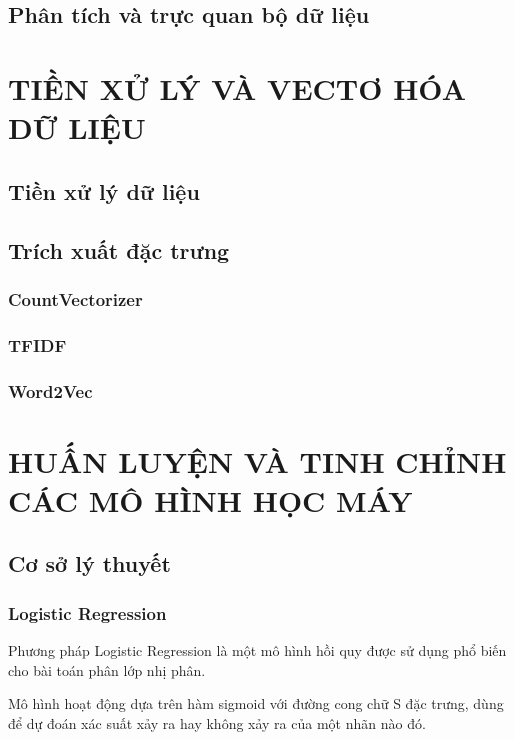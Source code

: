 \documentclass[12pt,a4paper,oneside]{book}
\begin{document}
	
	\section{Phân tích và trực quan bộ dữ liệu}




\chapter{TIỀN XỬ LÝ VÀ VECTƠ HÓA DỮ LIỆU}
	\section{Tiền xử lý dữ liệu}
	\section{Trích xuất đặc trưng}
		\subsection{CountVectorizer}
		\subsection{TFIDF}
		\subsection{Word2Vec}

\chapter{HUẤN LUYỆN VÀ TINH CHỈNH CÁC MÔ HÌNH HỌC MÁY}
	\section{Cơ sở lý thuyết}
		\subsection{Logistic Regression}
			Phương pháp Logistic Regression là một mô hình hồi quy được sử dụng phổ biến cho bài toán phân lớp nhị phân.

			Mô hình hoạt động dựa trên hàm sigmoid với đường cong chữ S đặc trưng, dùng để dự đoán xác suất xảy ra hay không xảy ra của một nhãn nào đó.
			
\end{document}
